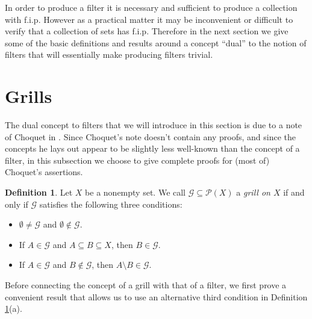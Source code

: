\documentclass[12pt]{article}
\theoremstyle{plain}
\theoremstyle{definition}
\newtheorem{defn}[thm]{Definition}
\newcommand{\calG}{\mathcal{G}}
\newcommand{\calP}{\mathcal{P}}
\begin{document}
In order to produce a filter it is necessary and sufficient to produce a collection with f.i.p.
However as a practical matter it may be inconvenient or difficult to verify that a collection of sets has f.i.p.
Therefore in the next section we give some of the basic definitions and results around a concept ``dual'' to the notion of filters that will essentially make producing filters trivial.

\section{Grills}
The dual concept to filters that we will introduce in this section is due to a note of Choquet in \cite{Choquet:1947uq}. 
Since Choquet's note doesn't contain any proofs, and since the concepts he lays out appear to be slightly less well-known than the concept of a filter, in this subsection we choose to give complete proofs for (most of)%
Choquet's assertions.

\begin{defn}
  \label{defn:grill}
  Let $X$ be a nonempty set.
  We call $\calG \subseteq \calP(X)$ a \textsl{grill on $X$} if and only if $\calG$ satisfies the following three conditions:
      \begin{itemize}
        \item[(1)] $\emptyset \ne \calG$ and $\emptyset \not\in \calG$.

        \item[(2)] If $A \in \calG$ and $A \subseteq B \subseteq X$, then $B \in \calG$.

        \item[(3)] If $A \in \calG$ and $B \not\in \calG$, then $A \setminus B \in \calG$. 
      \end{itemize}
\end{defn}

Before connecting the concept of a grill with that of a filter, we first prove a convenient result that allows us to use an alternative third condition in Definition \ref{defn:grill}(a).
\end{document}
